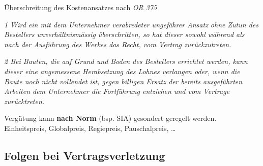 \noindent
Überschreitung des Kostenansatzes nach \textit{OR 375}

\textit{1 Wird ein mit dem Unternehmer verabredeter ungefährer Ansatz ohne Zutun des Bestellers unverhältnismässig überschritten, so hat dieser sowohl während als nach der Ausführung des Werkes das Recht, vom Vertrag zurückzutreten.}

\textit{2 Bei Bauten, die auf Grund und Boden des Bestellers errichtet werden, kann dieser eine angemessene Herabsetzung des Lohnes verlangen oder, wenn die Baute noch nicht vollendet ist, gegen billigen Ersatz der bereits ausgeführten Arbeiten dem Unternehmer die Fortführung entziehen und vom Vertrage zurücktreten.}

Vergütung kann \textbf{nach Norm} (bsp. SIA) gesondert geregelt werden. Einheitspreis, Globalpreis, Regiepreis, Pauschalpreis, \ldots

\subsection{Folgen bei Vertragsverletzung}

